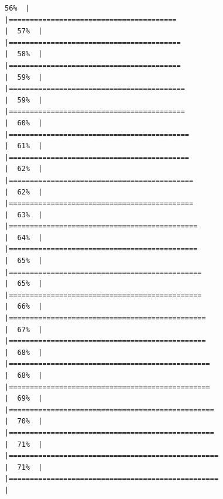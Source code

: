 \documentclass[
]{article}
\begin{document}
\begin{verbatim}
56%  |                                                                              |========================================                              |  57%  |                                                                              |=========================================                             |  58%  |                                                                              |=========================================                             |  59%  |                                                                              |==========================================                            |  59%  |                                                                              |==========================================                            |  60%  |                                                                              |===========================================                           |  61%  |                                                                              |===========================================                           |  62%  |                                                                              |============================================                          |  62%  |                                                                              |============================================                          |  63%  |                                                                              |=============================================                         |  64%  |                                                                              |=============================================                         |  65%  |                                                                              |==============================================                        |  65%  |                                                                              |==============================================                        |  66%  |                                                                              |===============================================                       |  67%  |                                                                              |===============================================                       |  68%  |                                                                              |================================================                      |  68%  |                                                                              |================================================                      |  69%  |                                                                              |=================================================                     |  70%  |                                                                              |=================================================                     |  71%  |                                                                              |==================================================                    |  71%  |                                                                              |==================================================                    |  
\end{verbatim}
\end{document}
